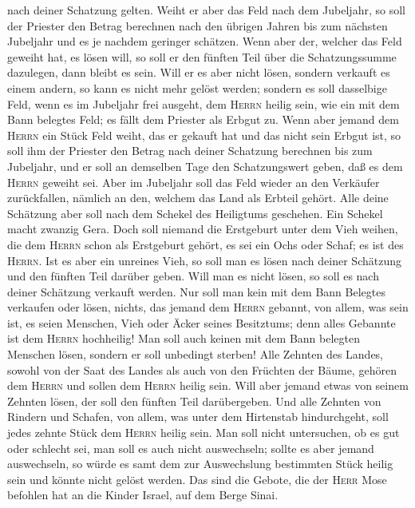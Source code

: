 nach deiner Schatzung gelten.  Weiht er aber das Feld
nach dem Jubeljahr, so soll der Priester den Betrag berechnen nach den
übrigen Jahren bis zum nächsten Jubeljahr und es je nachdem geringer
schätzen.  Wenn aber der, welcher das Feld geweiht hat,
es lösen will, so soll er den fünften Teil über die Schatzungssumme
dazulegen, dann bleibt es sein.  Will er es aber nicht
lösen, sondern verkauft es einem andern, so kann es nicht mehr gelöst
werden;  sondern es soll dasselbige Feld, wenn es im
Jubeljahr frei ausgeht, dem \textsc{Herrn} heilig sein, wie ein mit dem
Bann belegtes Feld; es fällt dem Priester als Erbgut zu. 
Wenn aber jemand dem \textsc{Herrn} ein Stück Feld weiht, das er gekauft
hat und das nicht sein Erbgut ist,  so soll ihm der
Priester den Betrag nach deiner Schatzung berechnen bis zum Jubeljahr,
und er soll an demselben Tage den Schatzungswert geben, daß es dem
\textsc{Herrn} geweiht sei.  Aber im Jubeljahr soll das
Feld wieder an den Verkäufer zurückfallen, nämlich an den, welchem das
Land als Erbteil gehört.  Alle deine Schätzung aber soll
nach dem Schekel des Heiligtums geschehen. Ein Schekel macht zwanzig
Gera.  Doch soll niemand die Erstgeburt unter dem Vieh
weihen, die dem \textsc{Herrn} schon als Erstgeburt gehört, es sei ein
Ochs oder Schaf; es ist des \textsc{Herrn}.  Ist es aber
ein unreines Vieh, so soll man es lösen nach deiner Schätzung und den
fünften Teil darüber geben. Will man es nicht lösen, so soll es nach
deiner Schätzung verkauft werden.  Nur soll man kein mit
dem Bann Belegtes verkaufen oder lösen, nichts, das jemand dem
\textsc{Herrn} gebannt, von allem, was sein ist, es seien Menschen, Vieh
oder Äcker seines Besitztums; denn alles Gebannte ist dem \textsc{Herrn}
hochheilig!  Man soll auch keinen mit dem Bann belegten
Menschen lösen, sondern er soll unbedingt sterben!  Alle
Zehnten des Landes, sowohl von der Saat des Landes als auch von den
Früchten der Bäume, gehören dem \textsc{Herrn} und sollen dem
\textsc{Herrn} heilig sein.  Will aber jemand etwas von
seinem Zehnten lösen, der soll den fünften Teil darübergeben.
 Und alle Zehnten von Rindern und Schafen, von allem, was
unter dem Hirtenstab hindurchgeht, soll jedes zehnte Stück dem
\textsc{Herrn} heilig sein.  Man soll nicht untersuchen,
ob es gut oder schlecht sei, man soll es auch nicht auswechseln; sollte
es aber jemand auswechseln, so würde es samt dem zur Auswechslung
bestimmten Stück heilig sein und könnte nicht gelöst werden.
 Das sind die Gebote, die der \textsc{Herr} Mose befohlen
hat an die Kinder Israel, auf dem Berge Sinai.
